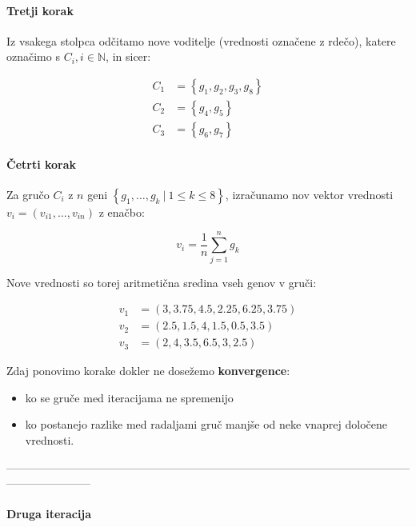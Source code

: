 \documentclass{article}
\begin{document}
\begin{enumerate}
		\paragraph{Tretji korak} Iz vsakega stolpca odčitamo nove voditelje (vrednosti označene z
		rdečo), katere označimo s $C_i, i \in\mathbb{N}$, in sicer:

		\begin{align*}
			C_1 &= \left\{ g_1, g_2, g_3, g_8 \right\} \\
			C_2 &= \left\{ g_4, g_5 \right\} \\
			C_3 &= \left\{ g_6, g_7 \right\}
		\end{align*}

		\paragraph{Četrti korak} Za gručo $C_i$ z $n$ geni $\left\{ g_1, \dots, g_{k} \ | \ 1 \leq k \leq 8 \right\}$,
		izračunamo nov vektor vrednosti $v_i = \left( v_{i1}, \dots, v_{in} \right)$ z enačbo:

		\begin{equation}
			v_{i} = \frac{ 1 }{ n} \sum_{j=1}^{n} g_{k}
		\end{equation}

		Nove vrednosti so torej aritmetična sredina vseh genov v gruči:

		\begin{align*}
			v_1 &= ( 3,   3.75, 4.5, 2.25, 6.25, 3.75 ) \\
			v_2 &= ( 2.5, 1.5,  4,   1.5,  0.5,  3.5 ) \\
			v_3 &= ( 2,   4,    3.5, 6.5,  3,    2.5 )
		\end{align*}

		Zdaj ponovimo korake dokler ne dosežemo \textbf{konvergence}:

		\begin{itemize}
			\item ko se gruče med iteracijama ne spremenijo
			\item ko postanejo razlike med radaljami gruč manjše od neke vnaprej določene vrednosti.
		\end{itemize}

		-----------------------------------------------------------------------------------------------------------------------------------

		\begin{center}
			\paragraph{Druga iteracija}
		\end{center}


\end{enumerate}
\end{document}
